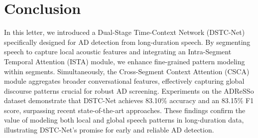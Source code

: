 \documentclass[journal]{IEEEtran}
\begin{document}
\section{Conclusion}
\label{sec:conclusion}
In this letter, we introduced a Dual-Stage Time-Context Network (DSTC-Net) specifically designed for AD detection from long-duration speech. 
By segmenting speech to capture local acoustic features and integrating an Intra-Segment Temporal Attention (ISTA) module, we enhance fine-grained pattern modeling within segments. 
Simultaneously, the Cross-Segment Context Attention (CSCA) module aggregates broader conversational features, effectively capturing global discourse patterns crucial for robust AD screening.
Experiments on the ADReSSo dataset demonstrate that DSTC-Net achieves 83.10\% accuracy and an 83.15\% F1 score, surpassing recent state-of-the-art approaches. 
These findings confirm the value of modeling both local and global speech patterns in long-duration data, illustrating DSTC-Net’s promise for early and reliable AD detection.



\clearpage              
  
           
\end{document}
